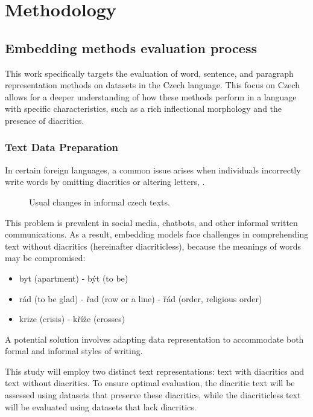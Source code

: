 
\chapter{Methodology\label{chap:methodology}}

\section{Embedding methods evaluation process}

This work specifically targets the evaluation of word, sentence, and paragraph representation methods on datasets in the Czech language.
This focus on Czech allows for a deeper understanding of how these methods perform in a language with specific characteristics, such as a rich inflectional morphology and the presence of diacritics.

\subsection{Text Data Preparation}
In certain foreign languages, a common issue arises when individuals incorrectly write words by omitting diacritics or altering letters, .

\begin{figure}[h]
  \centering
  
  \caption{Usual changes in informal czech texts.}
  \label{fig:diacritics_diacriticless}
\end{figure} 

This problem is prevalent in social media, chatbots, and other informal written communications.
As a result, embedding models face challenges in comprehending text without diacritics (hereinafter diacriticless), because the meanings of words may be compromised:
\begin{itemize}
  \item byt (apartment) - být (to be)
  \item rád (to be glad) - řad (row or a line) - řád (order, religious order)
  \item krize (crisis) - kříže (crosses)
\end{itemize}
A potential solution involves adapting data representation to accommodate both formal and informal styles of writing.

This study will employ two distinct text representations: text with diacritics and text without diacritics.
To ensure optimal evaluation, the diacritic text will be assessed using datasets that preserve these diacritics, while the diacriticless text will be evaluated using datasets that lack diacritics.

